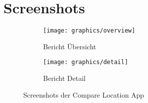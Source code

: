 \section{Screenshots}

\begin{figure}[H]
	\centering
	\begin{subfigure}{.4\textwidth}
		\centering
		\texttt{[image: graphics/overview]}
		\caption{Bericht Übersicht}
		\label{fig:overview}
	\end{subfigure}
	\begin{subfigure}{.4\textwidth}
		\centering
		\texttt{[image: graphics/detail]}
		\caption{Bericht Detail}
		\label{fig:detail}
	\end{subfigure}
	\caption{Screenshots der Compare Location App}
\end{figure}
